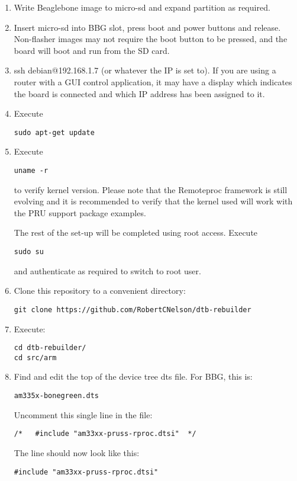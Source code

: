 \begin{enumerate}
\item  Write Beaglebone image to micro-sd and expand partition as required.
\item  Insert micro-sd into BBG slot, press boot and power buttons and release.  Non-flasher images may not require the boot button to be pressed, and the board will boot and run from the SD card.
\item  ssh debian@192.168.1.7 (or whatever the IP is set to).  If you are using a router with a GUI control application, it may have a display which indicates the board is connected and which IP address has been assigned to it.
\item  Execute
\begin{verbatim}
sudo apt-get update
\end{verbatim}
\item  Execute
\begin{verbatim}
uname -r
\end{verbatim} 
to verify kernel version.  Please note that the Remoteproc framework is still evolving and it is recommended to verify that the kernel used will work with the PRU support package examples.

The rest of the set-up will be completed using root access.
Execute
\begin{verbatim}
sudo su
\end{verbatim}
and authenticate as required to switch to root user.
\item Clone this repository to a convenient directory:

\begin{verbatim}
git clone https://github.com/RobertCNelson/dtb-rebuilder
\end{verbatim}

\item Execute:
\begin{verbatim}
cd dtb-rebuilder/ 
cd src/arm
\end{verbatim}
\item Find and edit the top of the device tree dts file.
For BBG, this is:
\begin{verbatim}
am335x-bonegreen.dts
\end{verbatim}
Uncomment this single line in the file:
\begin{verbatim}
/*   #include "am33xx-pruss-rproc.dtsi"  */
\end{verbatim}

The line should now look like this:
\begin{verbatim}
#include "am33xx-pruss-rproc.dtsi"
\end{verbatim}


\end{enumerate}
